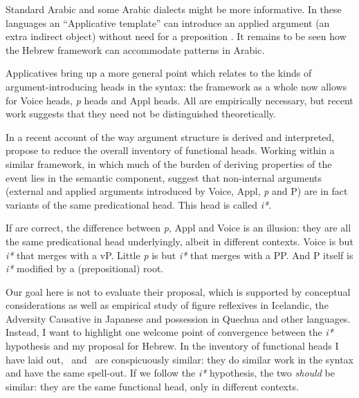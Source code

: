 Standard Arabic and some Arabic dialects might be more informative. In these languages an ``Applicative template'' can introduce an applied argument (an extra indirect object) without need for a preposition \citep{alkaabi12}. It remains to be seen how the Hebrew framework can accommodate patterns in Arabic.

Applicatives bring up a more general point which relates to the kinds of argument-introducing heads in the syntax: the framework as a whole now allows for Voice heads, \emph{p} heads and Appl heads. All are empirically necessary, but recent work suggests that they need not be distinguished theoretically.



In a recent account of the way argument structure is derived and interpreted, \cite{woodmarantz15} propose to reduce the overall inventory of functional heads. Working within a similar framework, in which much of the burden of deriving properties of the event lies in the semantic component, \citeauthor{woodmarantz15} suggest that non-internal arguments (external and applied arguments introduced by Voice, Appl, \emph{p} and P) are in fact variants of the same predicational head. This head is called \emph{i*}.

If \cite{woodmarantz15} are correct, the difference between \emph{p}, Appl and Voice is an illusion: they are all the same predicational head underlyingly, albeit in different contexts. Voice is but \emph{i*} that merges with a vP. Little \emph{p} is but \emph{i*} that merges with a PP. And P itself is \emph{i*} modified by a (prepositional) root.

Our goal here is not to evaluate their proposal, which is supported by conceptual considerations as well as empirical study of figure reflexives in Icelandic, the Adversity Causative in Japanese and possession in Quechua and other languages. Instead, I want to highlight one welcome point of convergence between the \emph{i*} hypothesis and my proposal for Hebrew. In the inventory of functional heads I have laid out, \vz~and \pz~are conspicuously similar: they do similar work in the syntax and have the same spell-out. If we follow the \emph{i*} hypothesis, the two \emph{should} be similar: they are the same functional head, only in different contexts.

